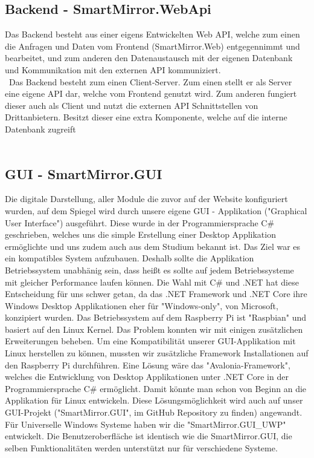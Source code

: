 \subsection{Backend - SmartMirror.WebApi}
Das Backend besteht aus einer eigens Entwickelten Web API, welche zum einen die Anfragen und Daten vom Frontend (SmartMirror.Web) entgegennimmt und bearbeitet, und zum anderen den Datenaustausch mit der eigenen Datenbank und Kommunikation mit den externen API kommuniziert.\\\
Das Backend besteht zum einen Client-Server. Zum einen stellt er als Server eine eigene API dar, welche vom Frontend genutzt wird. Zum anderen fungiert dieser auch als Client und nutzt die externen API Schnittstellen von Drittanbietern. Besitzt dieser eine extra Komponente, welche auf die interne Datenbank zugreift\\\
\subsection{GUI - SmartMirror.GUI}
Die digitale Darstellung, aller Module die zuvor auf der Website konfiguriert wurden, auf dem Spiegel wird durch unsere eigene GUI - Applikation ("Graphical User Interface") ausgeführt. Diese wurde in der Programmiersprache C# geschrieben, welches uns die simple Erstellung einer Desktop Applikation ermöglichte und uns zudem auch aus dem Studium bekannt ist. 
Das Ziel war es ein kompatibles System aufzubauen. Deshalb sollte die Applikation Betriebssystem unabhänig sein, dass heißt es sollte auf jedem Betriebssysteme mit gleicher Performance laufen können. Die Wahl mit C# und .NET hat diese Entscheidung für uns schwer getan, da das .NET Framework und .NET Core ihre Windows Desktop Applikationen eher für "Windows-only", von Microsoft, konzipiert wurden. Das Betriebssystem auf dem Raspberry Pi ist "Raspbian" und basiert auf den Linux Kernel. Das Problem konnten wir mit einigen zusätzlichen Erweiterungen beheben. Um eine Kompatibilität unserer GUI-Applikation mit Linux herstellen zu können, mussten wir zusätzliche Framework Installationen auf den Raspberry Pi durchführen. 
Eine Lösung wäre das "Avalonia-Framework", welches die Entwicklung von Desktop Applikationen unter .NET Core in der Programmiersprache C# ermöglicht. Damit könnte man schon von Beginn an die Applikation für Linux entwickeln. Diese Lösungsmöglichkeit wird auch auf unser GUI-Projekt ("SmartMirror.GUI", im GitHub Repository zu finden) angewandt. 
Für Universelle Windows Systeme haben wir die "SmartMirror.GUI_UWP" entwickelt. Die Benutzeroberfläche ist identisch wie die SmartMirror.GUI, die selben Funktionalitäten werden unterstützt nur für verschiedene Systeme.


